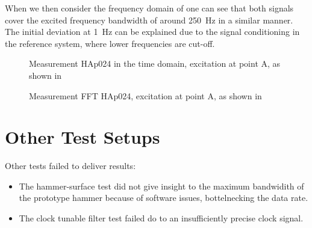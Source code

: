 When we then consider the frequency domain of  one can see that both signals cover the excited frequency bandwidth of around \SI{250}{\hertz} in a similar manner. The initial deviation at \SI{1}{\hertz} can be explained due to the signal conditioning in the reference system, where lower frequencies are cut-off.

\begin{figure}[!htb]
    \centering
    
    \caption[Andromeda Measurement HAp024, Time Domain in Z-Axis]{Measurement HAp024 in the time domain, excitation at point A, as shown in }
    \label{fig:HAp024_TDat_z}
\end{figure}
\begin{figure}[!htb]
    \centering
    
    \caption[Andromeda Measurement HAp024, FFT in Z-Axis]{Measurement FFT HAp024, excitation at point A, as shown in }
    \label{fig:HAp024_FFTa_z}
\end{figure}

\section{Other Test Setups}

Other tests failed to deliver results:
\begin{itemize}
    \item The hammer-surface test did not give insight to the maximum bandwidith of the prototype hammer because of software issues, bottelnecking the data rate.
    \item The clock tunable filter test failed do to an insufficiently precise clock signal.
\end{itemize}